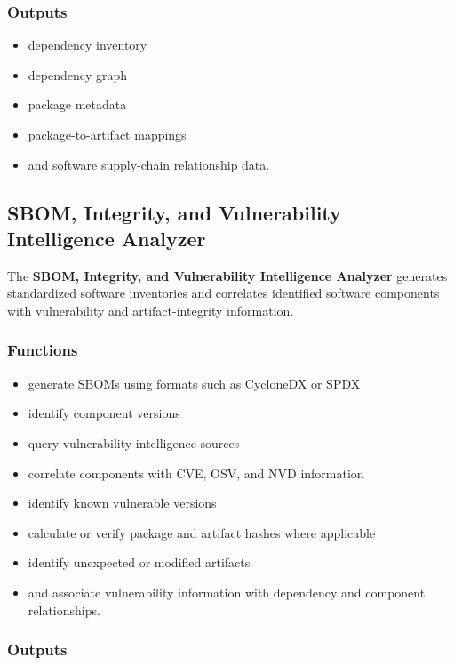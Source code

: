 \documentclass[
  12pt,
  letterpaper,
  oneside]{report}
\providecommand{\tightlist}{%
  \setlength{\itemsep}{0pt}\setlength{\parskip}{0pt}}
\begin{document}
\subsubsection{Outputs}\label{outputs}

\begin{itemize}
\tightlist
\item
  dependency inventory
\item
  dependency graph
\item
  package metadata
\item
  package-to-artifact mappings
\item
  and software supply-chain relationship data.
\end{itemize}

\subsection{SBOM, Integrity, and Vulnerability Intelligence Analyzer}\label{1032-sbom-integrity-and-vulnerability-intelligence-analyzer}

The \textbf{SBOM, Integrity, and Vulnerability Intelligence Analyzer}
generates standardized software inventories and correlates identified
software components with vulnerability and artifact-integrity
information.

\subsubsection{Functions}\label{functions-1}

\begin{itemize}
\tightlist
\item
  generate SBOMs using formats such as CycloneDX or SPDX
\item
  identify component versions
\item
  query vulnerability intelligence sources
\item
  correlate components with CVE, OSV, and NVD information
\item
  identify known vulnerable versions
\item
  calculate or verify package and artifact hashes where applicable
\item
  identify unexpected or modified artifacts
\item
  and associate vulnerability information with dependency and component
  relationships.
\end{itemize}

\subsubsection{Outputs}\label{outputs-1}
\end{document}
